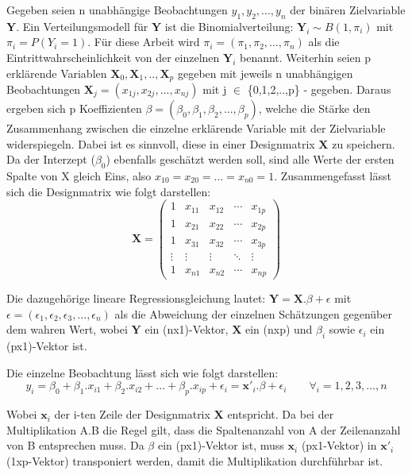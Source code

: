 \documentclass[12pt,]{article}
\begin{document}
Gegeben seien n unabhängige Beobachtungen \(y_1, y_2, ...,y_n\) der
binären Zielvariable \(\mathbf{Y}\). Ein Verteilungsmodell für
\(\mathbf{Y}\) ist die Binomialverteilung:
\(\mathbf{Y}_i \sim B(1, \pi_i)\) mit \(\pi_i = P(Y_i = 1)\). Für diese
Arbeit wird \(\pi_i = (\pi_1, \pi_2, ..., \pi_n)\) als die
Eintrittwahrscheinlichkeit von der einzelnen \(\mathbf{Y}_i\) benannt.
Weiterhin seien p erklärende Variablen
\(\mathbf{X}_0,\mathbf{X}_1,..,\mathbf{X}_p\) gegeben mit jeweils n
unabhängigen Beobachtungen
\(\mathbf{X}_j = (x_{1j}, x_{2j},..., x_{nj})\) mit j \(\in\)
\{0,1,2,..,p\} - gegeben. Daraus ergeben sich p Koeffizienten
\(\beta = (\beta_0, \beta_1, \beta_2,..., \beta_p)\), welche die Stärke
den Zusammenhang zwischen die einzelne erklärende Variable mit der
Zielvariable widerspiegeln. Dabei ist es sinnvoll, diese in einer
Designmatrix \(\mathbf{X}\) zu speichern. Da der Interzept (\(\beta_0\))
ebenfalls geschätzt werden soll, sind alle Werte der ersten Spalte von X
gleich Eins, also \(x_{10} = x_{20} = ... = x_{n0} = 1\).
Zusammengefasst lässt sich die Designmatrix wie folgt darstellen: \[
\mathbf{X} =
 \begin{pmatrix}
    1 & x_{11} & x_{12} & \cdots & x_{1p} \\
    1 & x_{21} & x_{22} & \cdots & x_{2p} \\
    1 & x_{31} & x_{32} & \cdots & x_{3p} \\
    \vdots  & \vdots  & \vdots & \ddots & \vdots \\
    1 & x_{n1} & x_{n2} & \cdots & x_{np}
 \end{pmatrix}
\]

Die dazugehörige lineare Regressionsgleichung lautet:
\(\mathbf{Y} = \mathbf{X}.\beta + \epsilon\) mit
\(\epsilon = (\epsilon_1, \epsilon_2, \epsilon_3, ..., \epsilon_n)\) als
die Abweichung der einzelnen Schätzungen gegenüber dem wahren Wert,
wobei \(\mathbf{Y}\) ein (nx1)-Vektor, \(\mathbf{X}\) ein (nxp) und
\(\beta_i\) sowie \(\epsilon_i\) ein (px1)-Vektor ist.

Die einzelne Beobachtung lässt sich wie folgt darstellen: \[
y_i = \beta_0 + \beta_1.x_{i1} + \beta_2.x_{i2} + ... + \beta_p.x_{ip} + \epsilon_i = \mathbf{x'}_i.\beta + \epsilon_i \qquad \forall_i = 1,2,3,...,n
\]

Wobei \(\mathbf{x}_i\) der i-ten Zeile der Designmatrix \(\mathbf{X}\)
entspricht. Da bei der Multiplikation A.B die Regel gilt, dass die
Spaltenanzahl von A der Zeilenanzahl von B entsprechen muss. Da
\(\beta\) ein (px1)-Vektor ist, muss \(\mathbf{x}_i\) (px1-Vektor) in
\(\mathbf{x'}_i\) (1xp-Vektor) transponiert werden, damit die
Multiplikation durchführbar ist.
\end{document}

